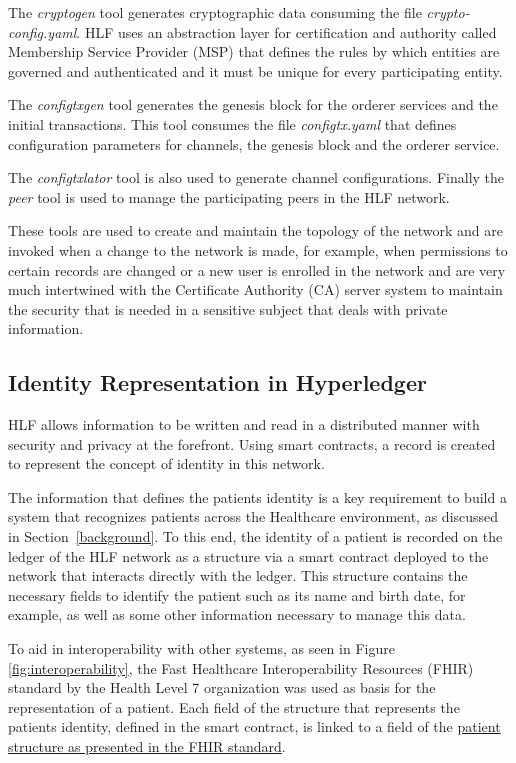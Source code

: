\documentclass[]{llncs}
\begin{document}
The \textit{cryptogen} tool generates cryptographic data consuming the file
\textit{crypto-config.yaml}.  HLF uses an abstraction layer for certification
and authority called Membership Service Provider (MSP) that defines the rules
by which entities are governed and authenticated and it must be unique for
every participating entity.

The \textit{configtxgen} tool generates the genesis block for the orderer
services and the initial transactions.  This tool consumes the file
\textit{configtx.yaml} that defines configuration parameters for channels, the
genesis block and the orderer service.

The \textit{configtxlator} tool is also used to generate channel configurations. 
Finally the \textit{peer} tool is used to manage the participating peers in the HLF network.

These tools are used to create and maintain the topology of the network and are
invoked when a change to the network is made, for example, when permissions to
certain records are changed or a new user is enrolled in the network and are
very much intertwined with the Certificate Authority (CA) server system to
maintain the security that is needed in a sensitive subject that deals with
private information.

\subsection{Identity Representation in Hyperledger}
 
HLF allows information to be written and read in a distributed manner with
security and privacy at the forefront. Using smart contracts, a record is
created to represent the concept of identity in this network.

The information that defines the patients identity is a key requirement to
build a system that recognizes patients across the Healthcare environment, as
discussed in Section~\ref{background}.  To this end, the identity of a patient
is recorded on the ledger of the HLF network as a structure via a smart
contract deployed to the network that interacts directly with the ledger.  This
structure contains the necessary fields to identify the patient such as its
name and birth date, for example, as well as some other information necessary
to manage this data. 

To aid in interoperability with other systems, as seen in Figure
\ref{fig:interoperability}, the Fast Healthcare Interoperability Resources
(FHIR) standard by the Health Level 7 organization was used as basis for the
representation of a patient.  Each field of the structure that represents the
patients identity, defined in the smart contract, is linked to a field of the
\href{http://www.hl7.org/fhir/patient.html}{patient structure as presented in
the FHIR standard}.
\end{document}
